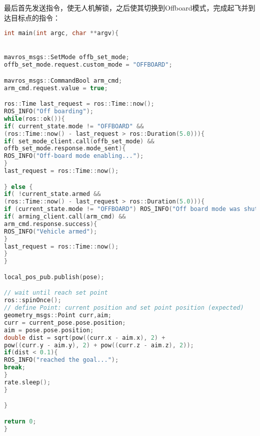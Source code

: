 最后首先发送指令，使无人机解锁，之后使其切换到Offboard模式，完成起飞并到达目标点的指令：
\begin{lstlisting}[language={C++}]
int main(int argc, char **argv){


mavros_msgs::SetMode offb_set_mode;
offb_set_mode.request.custom_mode = "OFFBOARD";

mavros_msgs::CommandBool arm_cmd;
arm_cmd.request.value = true;

ros::Time last_request = ros::Time::now();
ROS_INFO("Off boarding");
while(ros::ok()){
if( current_state.mode != "OFFBOARD" &&
(ros::Time::now() - last_request > ros::Duration(5.0))){
if( set_mode_client.call(offb_set_mode) &&
offb_set_mode.response.mode_sent){
ROS_INFO("Off-board mode enabling...");
}
last_request = ros::Time::now();

} else {
if( !current_state.armed &&
(ros::Time::now() - last_request > ros::Duration(5.0))){
if (current_state.mode != "OFFBOARD") ROS_INFO("Off board mode was shut unexpectedly");
if( arming_client.call(arm_cmd) &&
arm_cmd.response.success){
ROS_INFO("Vehicle armed");
}
last_request = ros::Time::now();
}
}

local_pos_pub.publish(pose);

// wait until reach set point
ros::spinOnce();
// define Point: current position and set point position (expected)
geometry_msgs::Point curr,aim;
curr = current_pose.pose.position;
aim = pose.pose.position;
double dist = sqrt(pow((curr.x - aim.x), 2) +
pow((curr.y - aim.y), 2) + pow((curr.z - aim.z), 2));
if(dist < 0.1){
ROS_INFO("reached the goal...");
break;
}
rate.sleep();
}

}

return 0;
}
\end{lstlisting}











